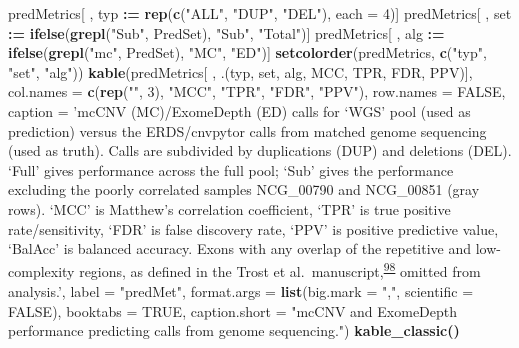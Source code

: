 \documentclass[11pt,letterpaper]{book}
\newenvironment{Shaded}{\begin{snugshade}}{\end{snugshade}}
\newcommand{\DataTypeTok}[1]{\textcolor[rgb]{0.13,0.29,0.53}{#1}}
\newcommand{\DecValTok}[1]{\textcolor[rgb]{0.00,0.00,0.81}{#1}}
\newcommand{\ErrorTok}[1]{\textcolor[rgb]{0.64,0.00,0.00}{\textbf{#1}}}
\newcommand{\KeywordTok}[1]{\textcolor[rgb]{0.13,0.29,0.53}{\textbf{#1}}}
\newcommand{\NormalTok}[1]{#1}
\newcommand{\OperatorTok}[1]{\textcolor[rgb]{0.81,0.36,0.00}{\textbf{#1}}}
\newcommand{\OtherTok}[1]{\textcolor[rgb]{0.56,0.35,0.01}{#1}}
\newcommand{\StringTok}[1]{\textcolor[rgb]{0.31,0.60,0.02}{#1}}
\begin{document}
\begin{Shaded}
\begin{Highlighting}[]
{{{{{{{{{{{{{\NormalTok{predMetrics[ , typ }\OperatorTok{:}\ErrorTok{=}\StringTok{ }\KeywordTok{rep}\NormalTok{(}\KeywordTok{c}\NormalTok{(}\StringTok{"ALL"}\NormalTok{, }\StringTok{"DUP"}\NormalTok{, }\StringTok{"DEL"}\NormalTok{), }\DataTypeTok{each =} \DecValTok{4}\NormalTok{)]}
\NormalTok{predMetrics[ , set }\OperatorTok{:}\ErrorTok{=}\StringTok{ }\KeywordTok{ifelse}\NormalTok{(}\KeywordTok{grepl}\NormalTok{(}\StringTok{"Sub"}\NormalTok{, PredSet), }\StringTok{"Sub"}\NormalTok{, }\StringTok{"Total"}\NormalTok{)]}
\NormalTok{predMetrics[ , alg }\OperatorTok{:}\ErrorTok{=}\StringTok{ }\KeywordTok{ifelse}\NormalTok{(}\KeywordTok{grepl}\NormalTok{(}\StringTok{"mc"}\NormalTok{, PredSet), }\StringTok{"MC"}\NormalTok{, }\StringTok{"ED"}\NormalTok{)]}
\KeywordTok{setcolorder}\NormalTok{(predMetrics, }\KeywordTok{c}\NormalTok{(}\StringTok{"typ"}\NormalTok{, }\StringTok{"set"}\NormalTok{, }\StringTok{"alg"}\NormalTok{))}
\KeywordTok{kable}\NormalTok{(predMetrics[ , .(typ, set, alg, MCC, TPR, FDR, PPV)],}
      \DataTypeTok{col.names =} \KeywordTok{c}\NormalTok{(}\KeywordTok{rep}\NormalTok{(}\StringTok{""}\NormalTok{, }\DecValTok{3}\NormalTok{), }\StringTok{"MCC"}\NormalTok{, }\StringTok{"TPR"}\NormalTok{, }\StringTok{"FDR"}\NormalTok{, }\StringTok{"PPV"}\NormalTok{),}
      \DataTypeTok{row.names =} \OtherTok{FALSE}\NormalTok{, }
      \DataTypeTok{caption =} \StringTok{'mcCNV (MC)/ExomeDepth (ED) calls for `WGS' pool (used as prediction) versus the ERDS/cnvpytor calls from matched genome sequencing (used as truth). Calls are subdivided by duplications (DUP) and deletions (DEL). `Full' gives performance across the full pool; `Sub' gives the performance excluding the poorly correlated samples NCG\_00790 and NCG\_00851 (gray rows). `MCC' is Matthew's correlation coefficient, `TPR' is true positive rate/sensitivity, `FDR' is false discovery rate, `PPV' is positive predictive value, `BalAcc' is balanced accuracy. Exons with any overlap of the repetitive and low-complexity regions, as defined in the Trost et al.~manuscript,\textsuperscript{\protect\hyperlink{ref-trost:2018aa}{98}} omitted from analysis.'}\NormalTok{,}
      \DataTypeTok{label =} \StringTok{"predMet"}\NormalTok{,}
      \DataTypeTok{format.args =} \KeywordTok{list}\NormalTok{(}\DataTypeTok{big.mark =} \StringTok{","}\NormalTok{, }\DataTypeTok{scientific =} \OtherTok{FALSE}\NormalTok{),}
      \DataTypeTok{booktabs =} \OtherTok{TRUE}\NormalTok{,}
      \DataTypeTok{caption.short =} \StringTok{"mcCNV and ExomeDepth performance predicting calls from genome sequencing."}\NormalTok{) }\OperatorTok{%>%}
\StringTok{  }\KeywordTok{kable_classic}\NormalTok{() }\OperatorTok{%>%}
}}}}}}}}}}}}}}}
\end{Highlighting}
\end{Shaded}
\end{document}
